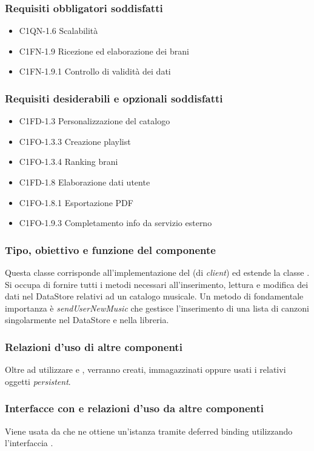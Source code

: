 \subsubsection*{Requisiti obbligatori soddisfatti}
\begin{itemize}
    \item C1QN-1.6 Scalabilit\`a
    \item C1FN-1.9 Ricezione ed elaborazione dei brani
    \item C1FN-1.9.1 Controllo di validit\`a dei dati
\end{itemize}
\subsubsection*{Requisiti desiderabili e opzionali soddisfatti}
\begin{itemize}
    \item C1FD-1.3 Personalizzazione del catalogo
    \item C1FO-1.3.3 Creazione playlist
    \item C1FO-1.3.4 Ranking brani
    \item C1FD-1.8 Elaborazione dati utente
    \item C1FO-1.8.1 Esportazione PDF
    \item C1FO-1.9.3 Completamento info da servizio esterno
\end{itemize}
\subsubsection*{Tipo, obiettivo e funzione del componente}
Questa classe corrisponde all'implementazione del  (di
\emph{client}) ed estende la classe . Si occupa di
fornire tutti i metodi necessari all'inserimento, lettura e modifica dei dati
nel DataStore relativi ad un catalogo musicale. Un
metodo di fondamentale importanza \`e
\emph{sendUserNewMusic} che gestisce l'inserimento di
una lista di canzoni singolarmente nel DataStore e nella
libreria.
\subsubsection*{Relazioni d'uso di altre componenti} Oltre ad utilizzare
 e , verranno creati, immagazzinati oppure usati
i relativi oggetti \emph{persistent}. 
\subsubsection*{Interfacce con e relazioni d'uso da altre
componenti} Viene usata da  che ne ottiene un'istanza
tramite deferred binding utilizzando l'interfaccia .
